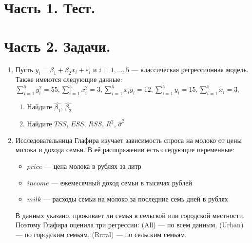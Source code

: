 \documentclass[12pt]{article}\usepackage[]{graphicx}\usepackage[svgnames]{xcolor}
\def \hs{\hat{\sigma}}
\def \e{\varepsilon}
\begin{document}



\section*{Часть 1. Тест.}


\section*{Часть 2. Задачи.}


\begin{enumerate}

\item Пусть $y_i = \beta_1 + \beta_2 x_i + \e_i$ и $i = 1, \dots, 5$ — классическая регрессионная модель. Также имеются следующие данные: $\sum_{i=1}^5 y_i^2 = 55, \sum_{i=1}^5 x_i^2 = 3, \sum_{i=1}^5 x_iy_i = 12, \sum_{i=1}^5 y_i = 15, \sum_{i=1}^5 x_i = 3$.

\begin{enumerate}
\item Найдите $\hat{\beta_1}$, $\hat{\beta_2}$
\item Найдите $TSS$, $ESS$, $RSS$, $R^2$, $\hs^2$
\end{enumerate}


\item Исследовательница Глафира изучает зависимость спроса на молоко от цены молока и дохода семьи. В её распоряжении есть следующие переменные:

\begin{itemize}
\item $price$ — цена молока в рублях за литр
\item $income$ — ежемесячный доход семьи в тысячах рублей
\item $milk$ — расходы семьи на молоко за последние семь дней в рублях
\end{itemize}

В данных указано, проживает ли семья в сельской или городской местности. Поэтому Глафира оценила три регрессии: (All) — по всем данным, (Urban) — по городским семьям, (Rural) — по сельским семьям.


\end{enumerate}
\end{document}
